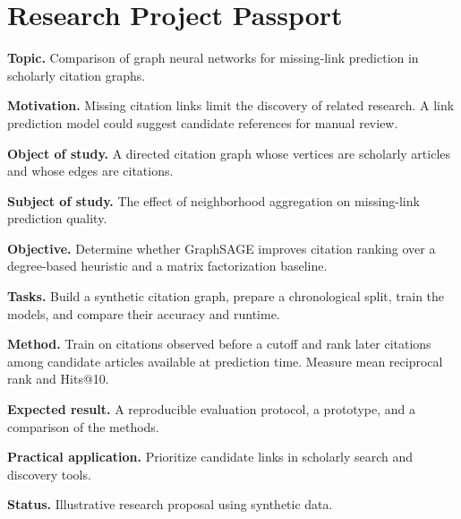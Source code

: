 \documentclass[a4paper,14pt,oneside]{extarticle}
\begin{document}
\fontsize{14bp}{17bp}\selectfont
\thispagestyle{empty}
\section*{Research Project Passport}

\textbf{Topic.} Comparison of graph neural networks for missing-link prediction in scholarly citation graphs.

\textbf{Motivation.} Missing citation links limit the discovery of related research.
  A link prediction model could suggest candidate references for manual review.

\textbf{Object of study.} A directed citation graph whose vertices are scholarly articles and
  whose edges are citations.

\textbf{Subject of study.} The effect of neighborhood aggregation on missing-link prediction quality.

\textbf{Objective.} Determine whether GraphSAGE improves citation ranking over a degree-based
  heuristic and a matrix factorization baseline.

\textbf{Tasks.} Build a synthetic citation graph, prepare a chronological split, train the models,
  and compare their accuracy and runtime.

\textbf{Method.} Train on citations observed before a cutoff and rank later citations
  among candidate articles available at prediction time. Measure mean reciprocal rank and Hits@10.

\textbf{Expected result.} A reproducible evaluation protocol, a prototype, and a comparison of the methods.

\textbf{Practical application.} Prioritize candidate links in scholarly search and discovery tools.

\textbf{Status.} Illustrative research proposal using synthetic data.
\end{document}
